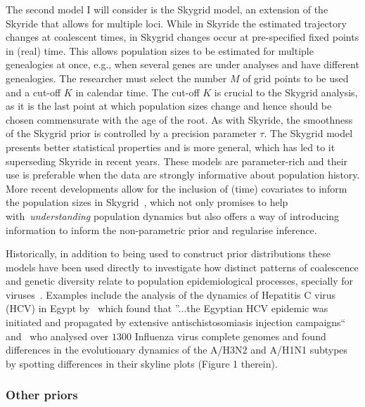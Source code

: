The second model I will consider is the Skygrid model, an extension of the Skyride that allows for multiple loci.
While in Skyride the estimated trajectory changes at coalescent times, in Skygrid changes occur at pre-specified fixed points in (real) time.
This allows population sizes to be estimated for multiple genealogies at once, e.g., when several genes are under analyses and have different genealogies.
The researcher must select the number $M$ of grid points to be used and a cut-off $K$ in calendar time.
The cut-off $ K $ is crucial to the Skygrid analysis, as it is the last point at which population sizes change and hence should be chosen commensurate with the age of the root.
As with Skyride, the smoothness of the Skygrid prior is controlled by a precision parameter $\tau$.
The Skygrid model presents better statistical properties and is more general, which has led to it superseding Skyride in recent years.
These models are parameter-rich and their use is preferable when the data are strongly informative about population history.
More recent developments allow for the inclusion of (time) covariates to inform the population sizes in Skygrid~\citep{Gill2016}, which not only promises to help with~\textit{understanding} population dynamics but also offers a way of introducing information to inform the non-parametric prior and regularise inference.

Historically, in addition to being used to construct prior distributions these models have been used directly to investigate how distinct patterns of coalescence and genetic diversity relate to population epidemiological processes, specially for viruses~\citep{Rodrigo1999,Pybus2000,Pybus2009}.
Examples include the analysis of the dynamics of Hepatitis C virus (HCV) in Egypt by~\cite{Pybus2003} which found that ''...the Egyptian HCV epidemic was initiated and propagated by extensive antischistosomiasis injection campaigns`` and~\cite{Rambaut2008} who analysed over $1300$ Influenza virus complete genomes and found differences in the evolutionary dynamics of the A/H3N2 and A/H1N1 subtypes by spotting differences in their skyline plots (Figure 1 therein).

\subsubsection{Other priors}

